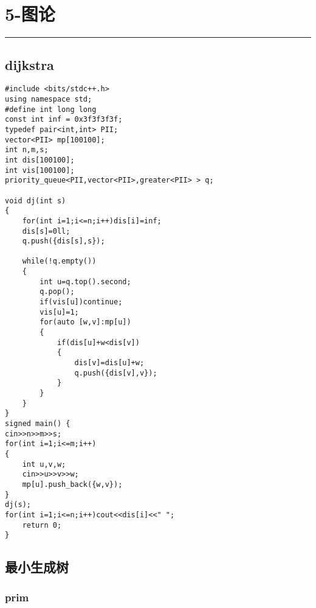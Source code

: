 \documentclass[]{article}
\begin{document}
\hypertarget{ux56feux8bba}{%
\section{5-图论}\label{ux56feux8bba}}

\begin{center}\rule{0.5\linewidth}{0.5pt}\end{center}

\hypertarget{dijkstra}{%
\subsection{dijkstra}\label{dijkstra}}

\begin{verbatim}
#include <bits/stdc++.h>
using namespace std;
#define int long long
const int inf = 0x3f3f3f3f;
typedef pair<int,int> PII;
vector<PII> mp[100100];
int n,m,s;
int dis[100100];
int vis[100100];
priority_queue<PII,vector<PII>,greater<PII> > q;

void dj(int s)
{
    for(int i=1;i<=n;i++)dis[i]=inf;
    dis[s]=0ll;
    q.push({dis[s],s});
    
    while(!q.empty())
    {
        int u=q.top().second;
        q.pop();
        if(vis[u])continue;
        vis[u]=1;
        for(auto [w,v]:mp[u])
        {
            if(dis[u]+w<dis[v])
            {
                dis[v]=dis[u]+w;
                q.push({dis[v],v});
            }
        }
    }
}
signed main() {
cin>>n>>m>>s;
for(int i=1;i<=m;i++)
{
    int u,v,w;
    cin>>u>>v>>w;
    mp[u].push_back({w,v});
}
dj(s);
for(int i=1;i<=n;i++)cout<<dis[i]<<" ";
    return 0;
}
\end{verbatim}

\hypertarget{ux6700ux5c0fux751fux6210ux6811}{%
\subsection{最小生成树}\label{ux6700ux5c0fux751fux6210ux6811}}

\hypertarget{prim}{%
\subsubsection{prim}\label{prim}}
\end{document}
